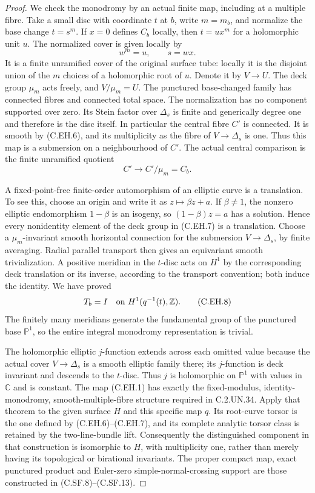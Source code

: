 \begin{proof}
We check the monodromy by an actual finite map, including
at a multiple fibre. Take a small disc with coordinate $t$
at $b$, write $m=m_b$, and normalize the base change
$t=s^m$. If $x=0$ defines $C_b$ locally, then
$t=u x^m$ for a holomorphic unit $u$. The normalized
cover is given locally by
\[
                     w^m=u,\qquad s=wx.
\tag{C.EH.6}
\]
It is a finite unramified cover of the original surface
tube: locally it is the disjoint union of the $m$ choices
of a holomorphic root of $u$. Denote it by $V\to U$.
The deck group $\mu_m$ acts freely, and $V/\mu_m=U$.
The punctured base-changed family has connected fibres
and connected total space. The normalization has no
component supported over zero. Its Stein factor over
$\Delta_s$ is finite and generically degree one and
therefore is the disc itself. In particular the central
fibre $C'$ is connected. It is smooth by (C.EH.6), and
its multiplicity as the fibre of $V\to\Delta_s$ is one.
Thus this map is a submersion on a neighbourhood of $C'$.
The actual central comparison is the finite unramified
quotient
\[
                         C'\longrightarrow C'/\mu_m=C_b.
\tag{C.EH.7}
\]

A fixed-point-free finite-order automorphism of an elliptic
curve is a translation. To see this, choose an origin and
write it as $z\mapsto\beta z+a$. If $\beta\ne1$, the
nonzero elliptic endomorphism $1-\beta$ is an isogeny,
so $(1-\beta)z=a$ has a solution. Hence every nonidentity
element of the deck group in (C.EH.7) is a translation.
Choose a $\mu_m$-invariant smooth horizontal connection
for the submersion $V\to\Delta_s$, by finite averaging.
Radial parallel transport then gives an equivariant
smooth trivialization. A positive meridian in the
$t$-disc acts on $H^1$ by the corresponding deck
translation or its inverse, according to the transport
convention; both induce the identity. We have proved
\[
                  T_b=I\quad\hbox{on }H^1(q^{-1}(t),\mathbb Z).
\tag{C.EH.8}
\]
The finitely many meridians generate the fundamental
group of the punctured base $\mathbb P^1$, so the entire
integral monodromy representation is trivial.

The holomorphic elliptic $j$-function extends across
each omitted value because the actual cover
$V\to\Delta_s$ is a smooth elliptic family there;
its $j$-function is deck invariant and descends to
the $t$-disc. Thus $j$ is holomorphic on $\mathbb P^1$
with values in $\mathbb C$ and is constant. The map
(C.EH.1) has exactly the fixed-modulus, identity-monodromy,
smooth-multiple-fibre structure required in C.2.UN.34.
Apply that theorem to the given surface $H$ and this
specific map $q$. Its root-curve torsor is the one
defined by (C.EH.6)--(C.EH.7), and its complete analytic
torsor class is retained by the two-line-bundle lift.
Consequently the distinguished component in that
construction is isomorphic to $H$, with multiplicity
one, rather than merely having its topological or
birational invariants. The proper compact map, exact
punctured product and Euler-zero simple-normal-crossing
support are those constructed in (C.SF.8)--(C.SF.13).
\end{proof}
